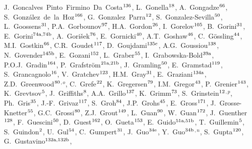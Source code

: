 \begin{flushleft}
J.~Goncalves~Pinto~Firmino~Da~Costa$^\textrm{\scriptsize 136}$,
L.~Gonella$^\textrm{\scriptsize 18}$,
A.~Gongadze$^\textrm{\scriptsize 66}$,
S.~Gonz\'alez~de~la~Hoz$^\textrm{\scriptsize 166}$,
G.~Gonzalez~Parra$^\textrm{\scriptsize 12}$,
S.~Gonzalez-Sevilla$^\textrm{\scriptsize 50}$,
L.~Goossens$^\textrm{\scriptsize 31}$,
P.A.~Gorbounov$^\textrm{\scriptsize 97}$,
H.A.~Gordon$^\textrm{\scriptsize 26}$,
I.~Gorelov$^\textrm{\scriptsize 105}$,
B.~Gorini$^\textrm{\scriptsize 31}$,
E.~Gorini$^\textrm{\scriptsize 74a,74b}$,
A.~Gori\v{s}ek$^\textrm{\scriptsize 76}$,
E.~Gornicki$^\textrm{\scriptsize 40}$,
A.T.~Goshaw$^\textrm{\scriptsize 46}$,
C.~G\"ossling$^\textrm{\scriptsize 44}$,
M.I.~Gostkin$^\textrm{\scriptsize 66}$,
C.R.~Goudet$^\textrm{\scriptsize 117}$,
D.~Goujdami$^\textrm{\scriptsize 135c}$,
A.G.~Goussiou$^\textrm{\scriptsize 138}$,
N.~Govender$^\textrm{\scriptsize 145b}$,
E.~Gozani$^\textrm{\scriptsize 152}$,
L.~Graber$^\textrm{\scriptsize 55}$,
I.~Grabowska-Bold$^\textrm{\scriptsize 39a}$,
P.O.J.~Gradin$^\textrm{\scriptsize 164}$,
P.~Grafstr\"om$^\textrm{\scriptsize 21a,21b}$,
J.~Gramling$^\textrm{\scriptsize 50}$,
E.~Gramstad$^\textrm{\scriptsize 119}$,
S.~Grancagnolo$^\textrm{\scriptsize 16}$,
V.~Gratchev$^\textrm{\scriptsize 123}$,
H.M.~Gray$^\textrm{\scriptsize 31}$,
E.~Graziani$^\textrm{\scriptsize 134a}$,
Z.D.~Greenwood$^\textrm{\scriptsize 80}$$^{,o}$,
C.~Grefe$^\textrm{\scriptsize 22}$,
K.~Gregersen$^\textrm{\scriptsize 79}$,
I.M.~Gregor$^\textrm{\scriptsize 43}$,
P.~Grenier$^\textrm{\scriptsize 143}$,
K.~Grevtsov$^\textrm{\scriptsize 5}$,
J.~Griffiths$^\textrm{\scriptsize 8}$,
A.A.~Grillo$^\textrm{\scriptsize 137}$,
K.~Grimm$^\textrm{\scriptsize 73}$,
S.~Grinstein$^\textrm{\scriptsize 12}$$^{,p}$,
Ph.~Gris$^\textrm{\scriptsize 35}$,
J.-F.~Grivaz$^\textrm{\scriptsize 117}$,
S.~Groh$^\textrm{\scriptsize 84}$,
J.P.~Grohs$^\textrm{\scriptsize 45}$,
E.~Gross$^\textrm{\scriptsize 171}$,
J.~Grosse-Knetter$^\textrm{\scriptsize 55}$,
G.C.~Grossi$^\textrm{\scriptsize 80}$,
Z.J.~Grout$^\textrm{\scriptsize 149}$,
L.~Guan$^\textrm{\scriptsize 90}$,
W.~Guan$^\textrm{\scriptsize 172}$,
J.~Guenther$^\textrm{\scriptsize 128}$,
F.~Guescini$^\textrm{\scriptsize 50}$,
D.~Guest$^\textrm{\scriptsize 162}$,
O.~Gueta$^\textrm{\scriptsize 153}$,
E.~Guido$^\textrm{\scriptsize 51a,51b}$,
T.~Guillemin$^\textrm{\scriptsize 5}$,
S.~Guindon$^\textrm{\scriptsize 2}$,
U.~Gul$^\textrm{\scriptsize 54}$,
C.~Gumpert$^\textrm{\scriptsize 31}$,
J.~Guo$^\textrm{\scriptsize 34e}$,
Y.~Guo$^\textrm{\scriptsize 34b}$$^{,n}$,
S.~Gupta$^\textrm{\scriptsize 120}$,
G.~Gustavino$^\textrm{\scriptsize 132a,132b}$,
$$
\end{flushleft}
